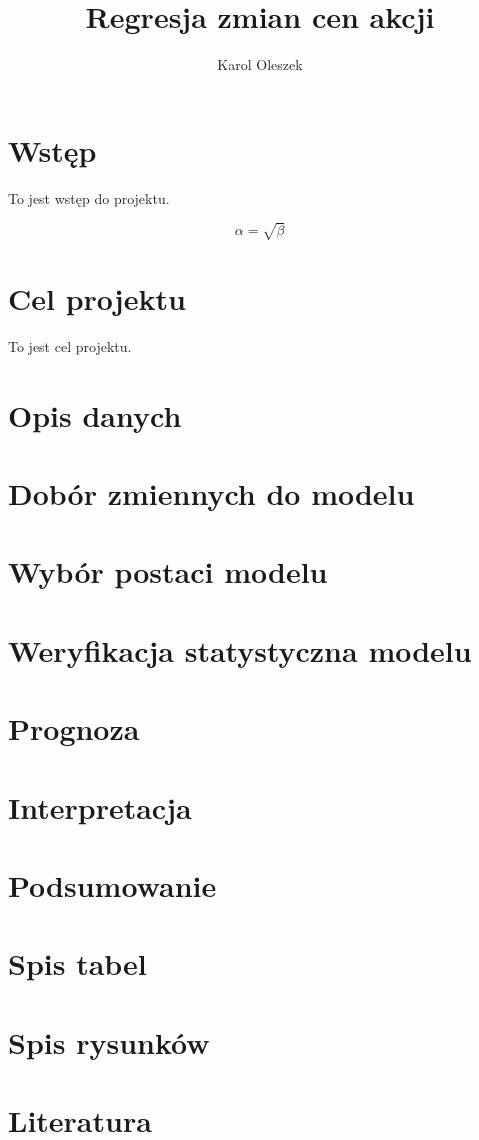 \documentclass{article}
\begin{document}
\title{Regresja zmian cen akcji}
\author{Karol Oleszek}

\maketitle
\tableofcontents


\section{Wstęp}
To jest wstęp do projektu.

\begin{equation}
    \label{simple_equation}
    \alpha = \sqrt{ \beta }
\end{equation}

\section{Cel projektu}
To jest cel projektu.

\section{Opis danych}

\section{Dobór zmiennych do modelu}

\section{Wybór postaci modelu}

\section{Weryfikacja statystyczna modelu}

\section{Prognoza}

\section{Interpretacja}

\section{Podsumowanie}

\section{Spis tabel}

\section{Spis rysunków}

\section{Literatura}
\end{document}
